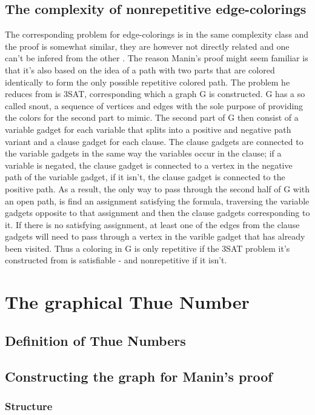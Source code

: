 \documentclass[12pt,a4paper]{article}
\begin{document}
\subsection{The complexity of nonrepetitive edge-colorings}

The corresponding problem for edge-colorings is in the same complexity class and the proof is somewhat similar, they are however not directly related and one can't be infered from the other \citep{Marx2009a}. The reason Manin's proof \citep{Manin2008} might seem familiar is that it's also based on the idea of a path with two parts that are colored identically to form the only possible repetitive colored path. The problem he reduces from is 3SAT, corresponding which a graph G is constructed. G has a so called snout, a sequence of vertices and edges with the sole purpose of providing the colors for the second part to mimic. The second part of G then consist of a variable gadget for each variable that splits into a positive and negative path variant and a clause gadget for each clause. The clause gadgets are connected to the variable gadgets in the same way the variables occur in the clause; if a variable is negated, the clause gadget is connected to a vertex in the negative path of the variable gadget, if it isn't, the clause gadget is connected to the positive path. As a result, the only way to pass through the second half of G with an open path, is find an assignment satisfying the formula, traversing the variable gadgets opposite to that assignment and then the clause gadgets corresponding to it. If there is no satisfying assignment, at least one of the edges from the clause gadgets will need to pass through a vertex in the varible gadget that has already been visited. Thus a coloring in G is only repetitive if the 3SAT problem it's constructed from is satisfiable - and nonrepetitive if it isn't.

\newpage

\section{The graphical Thue Number}
\subsection{Definition of Thue Numbers}
\subsection{Constructing the graph for Manin's proof}
\subsubsection{Structure}
\end{document}
